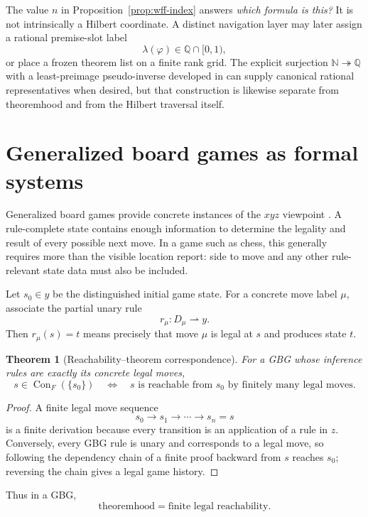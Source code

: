 \documentclass[11pt]{article}
\newtheorem{theorem}{Theorem}[section]
\theoremstyle{definition}
\newcommand{\Con}{\operatorname{Con}}
\newcommand{\N}{\mathbb N}
\newcommand{\Q}{\mathbb Q}
\begin{document}
The value $n$ in Proposition~\ref{prop:wff-index} answers \emph{which formula is this?} It is not intrinsically a Hilbert coordinate. A distinct navigation layer may later assign a rational premise-slot label
\[
\lambda(\varphi)\in \Q\cap[0,1),
\]
or place a frozen theorem list on a finite rank grid. The explicit surjection $\N\twoheadrightarrow\Q$ with a least-preimage pseudo-inverse developed in \cite{TennesonNQ} can supply canonical rational representatives when desired, but that construction is likewise separate from theoremhood and from the Hilbert traversal itself.

\section{Generalized board games as formal systems}

Generalized board games provide concrete instances of the $xyz$ viewpoint \cite{TennesonGBG20,TennesonGBGPublic}. A rule-complete state contains enough information to determine the legality and result of every possible next move. In a game such as chess, this generally requires more than the visible location report: side to move and any other rule-relevant state data must also be included.

Let $s_0\in y$ be the distinguished initial game state. For a concrete move label $\mu$, associate the partial unary rule
\[
r_\mu:D_\mu\rightharpoonup y.
\]
Then $r_\mu(s)=t$ means precisely that move $\mu$ is legal at $s$ and produces state $t$.

\begin{theorem}[Reachability--theorem correspondence]\label{thm:gbg-reach}
For a GBG whose inference rules are exactly its concrete legal moves,
\[
 s\in\Con_F(\{s_0\})
 \quad\Longleftrightarrow\quad
 s\text{ is reachable from }s_0\text{ by finitely many legal moves}.
\]
\end{theorem}

\begin{proof}
A finite legal move sequence
\[
s_0\to s_1\to\cdots\to s_n=s
\]
is a finite derivation because every transition is an application of a rule in $z$. Conversely, every GBG rule is unary and corresponds to a legal move, so following the dependency chain of a finite proof backward from $s$ reaches $s_0$; reversing the chain gives a legal game history.
\end{proof}

Thus in a GBG,
\[
\boxed{\text{theoremhood}=\text{finite legal reachability}.}
\]
\end{document}
